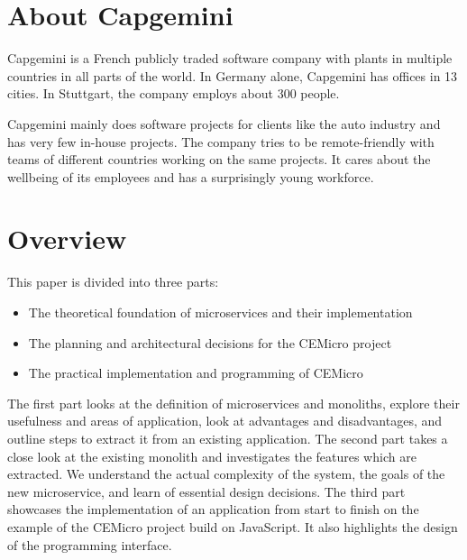 

\section{About Capgemini}
\label{sec:intro-about-capgemini}

Capgemini is a French publicly traded software company with plants in multiple countries in all parts of the world. In Germany alone, Capgemini has offices in 13 cities. In Stuttgart, the company employs about 300 people.

Capgemini mainly does software projects for clients like the auto industry and has very few in-house projects. The company tries to be remote-friendly with teams of different countries working on the same projects. It cares about the wellbeing of its employees and has a surprisingly young workforce.


\section{Overview}
\label{sec:intro:overview}

This paper is divided into three parts:

\begin{itemize}
 \item The theoretical foundation of microservices and their implementation
 \item The planning and architectural decisions for the CEMicro project
 \item The practical implementation and programming of CEMicro
\end{itemize}

The first part looks at the definition of microservices and monoliths, explore their usefulness and areas of application, look at advantages and disadvantages, and outline steps to extract it from an existing application. The second part takes a close look at the existing monolith and investigates the features which are extracted. We understand the actual complexity of the system, the goals of the new microservice, and learn of essential design decisions. The third part showcases the implementation of an application from start to finish on the example of the CEMicro project build on JavaScript. It also highlights the design of the programming interface.



